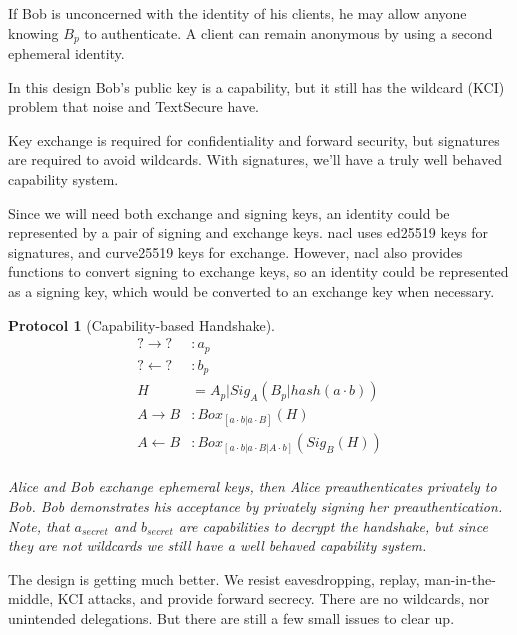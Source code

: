 \documentclass[12pt]{article}
\newtheorem{proto}{Protocol}
\begin{document}
If Bob is unconcerned with the identity of his clients,
he may allow anyone knowing $B_p$ to authenticate. A client can
remain anonymous by using a second ephemeral identity.

In this design Bob's public key is a capability,
but it still has the wildcard (KCI) problem that
noise and TextSecure have.

Key exchange is required for confidentiality and
forward security, but signatures are required to avoid wildcards.
With signatures, we'll have a truly well behaved capability system.

Since we will need both exchange and signing keys,
an identity could be represented by a pair of signing and exchange keys.
nacl uses ed25519 keys for signatures, and
curve25519 keys for exchange. However, nacl also provides
functions to convert signing to exchange keys,
so an identity could be represented as a signing key,
which would be converted to an exchange key when necessary.

\begin{samepage}
\begin{proto}[Capability-based Handshake]

  $$
  \begin{align*}
      ? \to ? &: a_{p}   \\
      ? \gets ? &: b_{p} \\
      H &= A_{p}|Sig_A(B_{p}|hash(a \cdot b)) \\
      A \to B &: Box_{[a \cdot b | a \cdot B]}(H)\\
      A \gets B &: Box_{[a \cdot b | a \cdot B | A \cdot b]}(Sig_B(H) )\\
  \end{align*}
  $$

  Alice and Bob exchange ephemeral keys, then Alice
  preauthenticates privately to Bob. Bob demonstrates his acceptance
  by privately signing her preauthentication.
  Note, that $a_{secret}$ and $b_{secret}$ are capabilities to decrypt
  the handshake, but since they are not wildcards we still have a well
  behaved capability system.

\end{proto}
\end{samepage}

The design is getting much better. We resist eavesdropping, replay,
man-in-the-middle, KCI attacks, and provide forward secrecy.
There are no wildcards, nor unintended delegations.
But there are still a few small issues to clear up.
\end{document}
